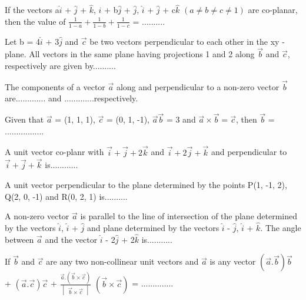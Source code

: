 \item If the vectors a$\hat{i}$ + $\hat{j}$ + $\hat{k}$, $\hat{i}$ + b$\hat{j}$ + $\hat{j}$, $\hat{i}$ + $\hat{j}$ + c$\hat{k}$ $(a \neq b \neq c \neq 1)$ are co-planar, then the value of 
$\frac{1}{1 - a} + \frac{1}{1 - b} + \frac{1}{1 - c}$ = ..........

\item Let b = 4$\hat{i}$ + 3$\hat{j}$ and $\overrightarrow{c}$ be two vectors perpendicular to each other in the xy - plane. All vectors in the same plane having projections 1 and 2 along $\overrightarrow{b}$ and $\overrightarrow{c}$, respectively are given by..........

\item The components of a vector $\overrightarrow{a}$ along and perpendicular to a non-zero vector 
$\overrightarrow{b}$ are............. and .............respectively.

\item Given that $\overrightarrow{a}$ = (1, 1, 1), $\overrightarrow{c}$ = (0, 1, -1), $\overrightarrow{a}\overrightarrow{b}$ = 3 and $\overrightarrow{a} \times \overrightarrow{b} = \overrightarrow{c}$, then $\overrightarrow{b}$ = .................

\item A unit vector co-planr with $\overrightarrow{i} + \overrightarrow{j} + 2\overrightarrow{k}$ and 
$\overrightarrow{i} + 2\overrightarrow{j} + \overrightarrow{k}$ and perpendicular to $\overrightarrow{i} + \overrightarrow{j} + \overrightarrow{k}$ is............

\item A unit vector perpendicular to the plane determined by the points P(1, -1, 2), Q(2, 0, -1) and R(0, 2, 1) is..........

\item A non-zero vector $\overrightarrow{a}$ is parallel to the line of intersection of the plane determined by the vectors $\hat{i}$, $\hat{i}$ + $\hat{j}$ and plane determined by the vectors $\hat{i}$ - $\hat{j}$, 
$\hat{i}$ + $\hat{k}$. The angle between $\overrightarrow{a}$ and the vector $\hat{i}$ - 2$\hat{j}$ + 2$\hat{k}$ is...........

\item If $\overrightarrow{b}$ and $\overrightarrow{c}$ are any two non-collinear unit vectors and $\overrightarrow{a}$ is any vector $(\overrightarrow{a} . \overrightarrow{b})\overrightarrow{b}$ + $(\overrightarrow{a} . \overrightarrow{c})\overrightarrow{c}$ + $\frac{\overrightarrow{a} . (\overrightarrow{b} \times \overrightarrow{c})}{\begin{vmatrix} \overrightarrow{b} \times \overrightarrow{c} \end{vmatrix}}$ 
$(\overrightarrow{b} \times \overrightarrow{c})$ = ..............

